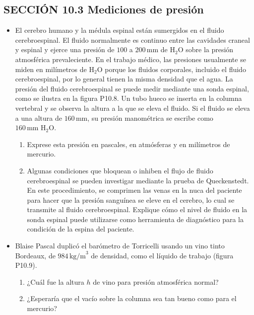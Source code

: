\documentclass[11pt,a4paper]{article}
\begin{document}
\newpage

\subsection*{SECCIÓN 10.3 Mediciones de presión}

\begin{itemize}
    \item[\textbf{8.}] El cerebro humano y la médula espinal están sumergidos en el fluido cerebroespinal. El fluido normalmente es continuo entre las cavidades craneal y espinal y ejerce una presión de \(100\) a \(200\,\text{mm}\) de \(\text{H}_2\text{O}\) sobre la presión atmosférica prevaleciente. En el trabajo médico, las presiones usualmente se miden en milímetros de \(\text{H}_2\text{O}\) porque los fluidos corporales, incluido el fluido cerebroespinal, por lo general tienen la misma densidad que el agua. La presión del fluido cerebroespinal se puede medir mediante una sonda espinal, como se ilustra en la figura P10.8. Un tubo hueco se inserta en la columna vertebral y se observa la altura a la que se eleva el fluido. Si el fluido se eleva a una altura de \(160\,\text{mm}\), su presión manométrica se escribe como \(160\,\text{mm H}_2\text{O}\).
    \begin{enumerate}
        \item Exprese esta presión en pascales, en atmósferas y en milímetros de mercurio.
        \item Algunas condiciones que bloquean o inhiben el flujo de fluido cerebroespinal se pueden investigar mediante la prueba de Queckenstedt. En este procedimiento, se comprimen las venas en la nuca del paciente para hacer que la presión sanguínea se eleve en el cerebro, lo cual se transmite al fluido cerebroespinal. Explique cómo el nivel de fluido en la sonda espinal puede utilizarse como herramienta de diagnóstico para la condición de la espina del paciente.
    \end{enumerate}
    
    \vspace*{8cm}
    
    \item[\textbf{9.}] Blaise Pascal duplicó el barómetro de Torricelli usando un vino tinto Bordeaux, de \(984\,\text{kg/m}^3\) de densidad, como el líquido de trabajo (figura P10.9).
    \begin{enumerate}
        \item ¿Cuál fue la altura \(h\) de vino para presión atmosférica normal?
        \item ¿Esperaría que el vacío sobre la columna sea tan bueno como para el mercurio?
    \end{enumerate}
    

\end{itemize}
\end{document}
